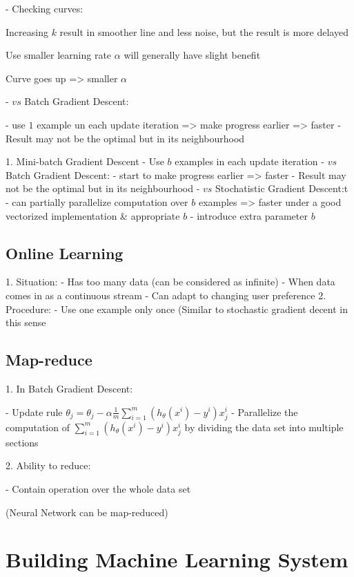 - Checking curves:

Increasing $k$ result in smoother line and less noise, but the result is more delayed

Use smaller learning rate $\alpha$ will generally have slight benefit

Curve goes up => smaller $\alpha$ 

- $vs$ Batch Gradient Descent:

- use $1$ example un each update iteration => make progress earlier => faster
- Result may not be the optimal but in its neighbourhood

1. Mini-batch Gradient Descent
- Use $b$ examples in each update iteration
- $vs$  Batch Gradient Descent:
- start to make progress earlier => faster
- Result may not be the optimal but in its neighbourhood
- $vs$ Stochatistic Gradient Descent:t
- can partially parallelize computation over $b$ examples => faster under a good vectorized implementation \& appropriate $b$ 
- introduce extra parameter $b$ 

\subsection{Online Learning}

1. Situation:
- Has too many data (can be considered as infinite)
- When data comes in as a continuous stream
- Can adapt to changing user preference
2. Procedure:
- Use one example only once (Similar to stochastic gradient decent in this sense

\subsection{Map-reduce}

1. In Batch Gradient Descent:

- Update rule $\displaystyle \theta_j = \theta_j - \alpha \frac 1 m \sum^m_{i=1} (h_\theta(x^i)-y^i)x_j^i$ 
- Parallelize the computation of $\displaystyle \sum^m_{i=1} (h_\theta(x^i)-y^i)x_j^i$ by dividing the data set into multiple sections

2. Ability to reduce:

- Contain operation over the whole data set

(Neural Network can be map-reduced)

\section{Building Machine Learning System}


